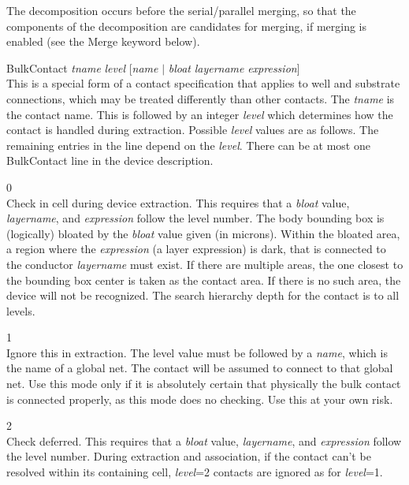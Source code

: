 \begin{description}
The decomposition occurs before the serial/parallel merging, so that
the components of the decomposition are candidates for merging, if
merging is enabled (see the {\et Merge} keyword below).

\item{\vt BulkContact} {\it tname} {\it level} [{\it name} $|$
{\it bloat} {\it layername} {\it expression\/}]\\
This is a special form of a contact specification that applies to well
and substrate connections, which may be treated differently than other
contacts.  The {\it tname} is the contact name.  This is followed by
an integer {\it level} which determines how the contact is handled
during extraction.  Possible {\it level} values are as follows.  The
remaining entries in the line depend on the {\it level}.  There can be
at most one {\vt BulkContact} line in the device description.

\begin{description}
\item{0}\\
Check in cell during device extraction.  This requires that a {\it
bloat} value, {\it layername\/}, and {\it expression} follow the level
number.  The body bounding box is (logically) bloated by the {\it
bloat} value given (in microns).  Within the bloated area, a region
where the {\it expression} (a layer expression) is dark, that is
connected to the conductor {\it layername} must exist.  If there are
multiple areas, the one closest to the bounding box center is taken as
the contact area.  If there is no such area, the device will not be
recognized.  The search hierarchy depth for the contact is to all
levels.

\item{1}\\
Ignore this in extraction.  The level value must be followed by a {\it
name\/}, which is the name of a global net.  The contact will be
assumed to connect to that global net.  Use this mode only if it is
absolutely certain that physically the bulk contact is connected
properly, as this mode does no checking.  Use this at your own risk.

\item{2}\\
Check deferred.  This requires that a {\it bloat} value, {\it
layername\/}, and {\it expression} follow the level number.  During
extraction and association, if the contact can't be resolved within
its containing cell, {\it level\/}=2 contacts are ignored as for {\it
level\/}=1.


\end{description}
\end{description}
